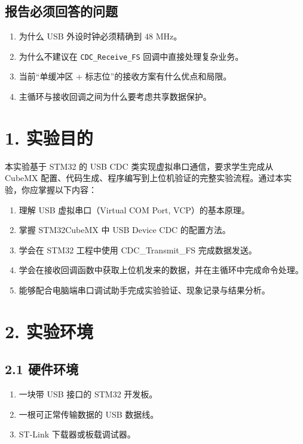 \documentclass[
  chinese,
  UTF8,
  oneside,
  openany]{ctexbook}
\providecommand{\tightlist}{%
  \setlength{\itemsep}{0pt}\setlength{\parskip}{0pt}}
\begin{document}
\subsection{报告必须回答的问题}\label{ux62a5ux544aux5fc5ux987bux56deux7b54ux7684ux95eeux9898-3}

\begin{enumerate}
\def\labelenumi{\arabic{enumi}.}
\tightlist
\item
  为什么 USB 外设时钟必须精确到 48 MHz。
\item
  为什么不建议在 \texttt{CDC\_Receive\_FS} 回调中直接处理复杂业务。
\item
  当前``单缓冲区 + 标志位''的接收方案有什么优点和局限。
\item
  主循环与接收回调之间为什么要考虑共享数据保护。
\end{enumerate}

\section{1. 实验目的}\label{ux5b9eux9a8cux76eeux7684}

本实验基于 STM32 的 USB CDC 类实现虚拟串口通信，要求学生完成从 CubeMX
配置、代码生成、程序编写到上位机验证的完整实验流程。通过本实验，你应掌握以下内容：

\begin{enumerate}
\def\labelenumi{\arabic{enumi}.}
\tightlist
\item
  理解 USB 虚拟串口（Virtual COM Port, VCP）的基本原理。
\item
  掌握 STM32CubeMX 中 USB Device CDC 的配置方法。
\item
  学会在 STM32 工程中使用 CDC\_Transmit\_FS 完成数据发送。
\item
  学会在接收回调函数中获取上位机发来的数据，并在主循环中完成命令处理。
\item
  能够配合电脑端串口调试助手完成实验验证、现象记录与结果分析。
\end{enumerate}

\section{2. 实验环境}\label{ux5b9eux9a8cux73afux5883}

\subsection{2.1 硬件环境}\label{ux786cux4ef6ux73afux5883}

\begin{enumerate}
\def\labelenumi{\arabic{enumi}.}
\tightlist
\item
  一块带 USB 接口的 STM32 开发板。
\item
  一根可正常传输数据的 USB 数据线。
\item
  ST-Link 下载器或板载调试器。
\end{enumerate}
\end{document}
